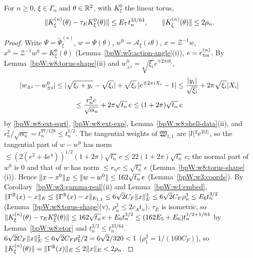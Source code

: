 \begin{lemma}\label{bpW:w8:shell-close}
For $n\ge0$, $\xi\in\Gamma_n$ and $\theta\in\mathbb{R}^2$, with $K^0_\xi$ the linear torus,
\[\lVert K^{(n)}_\xi(\theta)-\tau_EK^0_\xi(\theta)\rVert\le E_7\,t_n^{33/64},\qquad\lVert K^{(n)}_\xi(\theta)\rVert\le2\rho_n.\]
\end{lemma}
\begin{proof}
Write $\Psi=\tilde\Psi^{(n)}_\xi$, $w=\Psi(\theta)$, $w^0=\mathcal A_\xi(\iota\theta)$, $x=\mathcal Z^{-1}w$, $x^0=\mathcal Z^{-1}w^0=K^0_\xi(\theta)$
(Lemma~\ref{bpW:w5:action-angle}(i)), $e=e^{(n)}_{\rm tor}$.
\label{stepW:w8:sc-tan} By Lemma~\ref{bpW:w8:torus-shape}(ii) and $w^0_{\pm i}=\sqrt{\xi_i}e^{\mp2\pi i\theta_i}$,
\begin{multline*}\lvert w_{\pm i}-w^0_{\pm i}\rvert\le\lvert \sqrt{\xi_i+y_i}-\sqrt{\xi_i}\rvert+\sqrt{\xi_i}\,\lvert e^{\mp2\pi iX_i}-1\rvert\le\frac{\lvert y_i\rvert}{\sqrt{\xi_i}}+2\pi\sqrt{\xi_i}\lvert X_i\rvert\\
\le\frac{r_n^2e}{\sqrt{\alpha_n}}+2\pi\sqrt{t_n}\,e\le(1+2\pi)\sqrt{t_n}\,e\end{multline*}
by \ref{bpW:w8:ext-sqrt}, \ref{bpW:w8:ext-exp}, Lemma~\ref{bpW:w8:shell-data}(ii), and $r_n^2/\sqrt{\alpha_n}=t_n^{97/128}\le t_n^{1/2}$.
\label{stepW:w8:sc-dist} The tangential weights of $\mathfrak W_{1,1}$ are $\lvert l\rvert^2e^{2\lvert l\rvert}$, so the tangential part
of $w-w^0$ has norm $\le(2(e^2+4e^4))^{1/2}(1+2\pi)\sqrt{t_n}\,e\le22(1+2\pi)\sqrt{t_n}\,e$; the normal part of $w^0$ is $0$ and that of $w$
has norm $\le r_ne\le\sqrt{t_n}\,e$ (Lemma~\ref{bpW:w8:torus-shape}(i)). Hence $\lVert x-x^0\rVert_E\le\lVert w-w^0\rVert\le162\sqrt{t_n}\,e$
(Lemma~\ref{bpW:w3:coords}).
\label{stepW:w8:sc-gamma} By Corollary~\ref{bpW:w3:gamma-real}(ii) and Lemma~\ref{bpW:w1:embed},
$\lVert \Gamma^{\mathbb{R}}(x)-x\rVert_E\le\lVert \Gamma^{\mathbb{R}}(x)-x\rVert_{E_{1,2}}\le6\sqrt2C_F\lVert x\rVert_E^3\le6\sqrt2C_F\rho_n^3\le E_6t_n^{3/2}$
(Lemma~\ref{bpW:w8:torus-shape}(v), $\rho_n^2\le2c_At_n$).
\label{stepW:w8:sc-close} $\tau_E$ is isometric, so
$\lVert K^{(n)}_\xi(\theta)-\tau_EK^0_\xi(\theta)\rVert\le162\sqrt{t_n}\,e+E_6t_n^{3/2}\le(162E_5+E_6)t_n^{1/2+1/64}$ by
Lemma~\ref{bpW:w8:etor} and $t_n^{3/2}\le t_n^{33/64}$.
\label{stepW:w8:sc-size} $6\sqrt2C_F\lVert x\rVert_E^2\le6\sqrt2C_F\rho_1^2/2=6\sqrt2/320<1$ ($\rho_1^2=1/(160C_F)$), so
$\lVert K^{(n)}_\xi(\theta)\rVert=\lVert \Gamma^{\mathbb{R}}(x)\rVert_E\le2\lVert x\rVert_E<2\rho_n$.
\end{proof}

